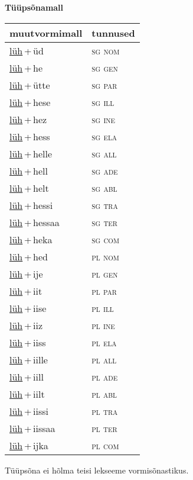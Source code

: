 
\vspace{1.8em}
\begin{minipage}{\textwidth}
\textbf{Tüüpsõnamall \,}\\

\begin{sideways}
\begin{tabular}{l l}
muutvormimall & tunnused \\
\hline
\underline{lüh}\,+\,üd & \textsc{ sg nom } \\
\underline{lüh}\,+\,he & \textsc{ sg gen } \\
\underline{lüh}\,+\,ütte & \textsc{ sg par } \\
\underline{lüh}\,+\,hese & \textsc{ sg ill } \\
\underline{lüh}\,+\,hez & \textsc{ sg ine } \\
\underline{lüh}\,+\,hess & \textsc{ sg ela } \\
\underline{lüh}\,+\,helle & \textsc{ sg all } \\
\underline{lüh}\,+\,hell & \textsc{ sg ade } \\
\underline{lüh}\,+\,helt & \textsc{ sg abl } \\
\underline{lüh}\,+\,hessi & \textsc{ sg tra } \\
\underline{lüh}\,+\,hessaa & \textsc{ sg ter } \\
\underline{lüh}\,+\,heka & \textsc{ sg com } \\
\underline{lüh}\,+\,hed & \textsc{ pl nom } \\
\underline{lüh}\,+\,ije & \textsc{ pl gen } \\
\underline{lüh}\,+\,iit & \textsc{ pl par } \\
\underline{lüh}\,+\,iise & \textsc{ pl ill } \\
\underline{lüh}\,+\,iiz & \textsc{ pl ine } \\
\underline{lüh}\,+\,iiss & \textsc{ pl ela } \\
\underline{lüh}\,+\,iille & \textsc{ pl all } \\
\underline{lüh}\,+\,iill & \textsc{ pl ade } \\
\underline{lüh}\,+\,iilt & \textsc{ pl abl } \\
\underline{lüh}\,+\,iissi & \textsc{ pl tra } \\
\underline{lüh}\,+\,iissaa & \textsc{ pl ter } \\
\underline{lüh}\,+\,ijka & \textsc{ pl com } \\
\end{tabular}
\end{sideways}
\label{tab:tüüpsõnamall-lühüd}

\end{minipage}

 
\vspace{1em}
\noindent Tüüpsõna ei hõlma teisi lekseeme vormi\-sõnastikus.

